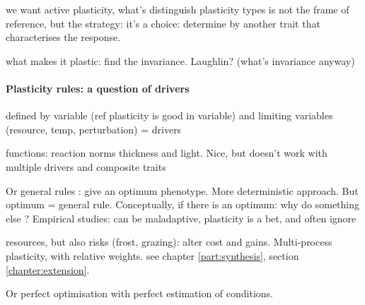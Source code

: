 {%





we want active plasticity, what's distinguish plasticity types is not the frame of reference, but the strategy: it's a choice: determine by another trait that characterises the response.

what makes it plastic: find the invariance. Laughlin? (what's invariance anyway)

\paragraph{Plasticity rules: a question of drivers}

defined by variable (ref plasticity is good in variable) and limiting variables (resource, temp, perturbation) = drivers

functions: reaction norms \parencite{feller_mathematical_2015} thickness and light. Nice, but doesn't work with multiple drivers and composite traits

Or general rules : give an optimum phenotype. More deterministic approach. But optimum = general rule. Conceptually, if there is an optimum: why do something else ? Empirical studies: can be maladaptive, plasticity is a bet, and often ignore 

resources, but also risks (frost, grazing): alter cost and gains. Multi-process plasticity, with relative weights. see chapter \ref{part:synthesis}, section \ref{chapter:extension}.


Or perfect optimisation with perfect estimation of conditions.





}
